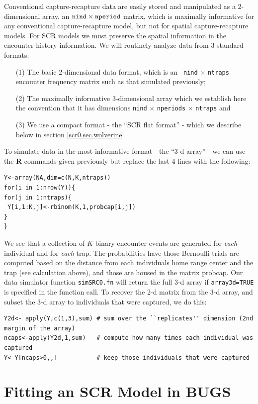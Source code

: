 Conventional capture-recapture data are easily stored and manipulated
as a 2-dimensional array, an $\mbox{\tt nind} \times \mbox{\tt
  nperiod}$ matrix, which is maximally informative for any
conventional capture-recapture model, but not for spatial
capture-recapture models.  For SCR models we must preserve the spatial
information in the encounter history information. We will routinely
analyze data from 3 standard formats:
\begin{itemize}
\item[(1)] The basic 2-dimensional data format, which is an \mbox{\tt
    nind} $\times$ \mbox{\tt ntraps} encounter frequency matrix such
  as that simulated previously;
\item[(2)] The maximally informative 3-dimensional array which we
  establish here the convention that it has dimensions \mbox{\tt nind}
  $\times$ \mbox{\tt nperiods} $\times$ \mbox{\tt ntraps} and
\item[(3)] We use a compact format - the ``SCR flat format'' - which
  we describe below in section \ref{scr0.sec.wolverine}.
\end{itemize}
To simulate data in the most informative format - the ``3-d array'' -
we can use the {\bf R} commands given previously but replace the last
4 lines with the following:
\begin{verbatim}
Y<-array(NA,dim=c(N,K,ntraps))
for(i in 1:nrow(Y)){
for(j in 1:ntraps){
 Y[i,1:K,j]<-rbinom(K,1,probcap[i,j])
}
}
\end{verbatim}
We see that a collection of $K$ binary encounter events are generated
for {\it each} individual and for {\it each} trap.  The probabilities
have those Bernoulli trials are computed based on the distance from
each individuals home range center and the trap (see calculation
above), and those are housed in the matrix probcap. Our data simulator
function \mbox{\tt simSRC0.fn} will return the full 3-d array if
\mbox{\tt array3d=TRUE} is specified in the function call.  To recover
the 2-d matrix from the 3-d array, and subset the 3-d array to
individuals that were captured, we do this:
{\small
\begin{verbatim}
Y2d<- apply(Y,c(1,3),sum) # sum over the ``replicates'' dimension (2nd margin of the array)
ncaps<-apply(Y2d,1,sum)   # compute how many times each individual was captured
Y<-Y[ncaps>0,,]           # keep those individuals that were captured
\end{verbatim}
}


\section{Fitting an SCR Model in BUGS}
\label{scr0.sec.winbugs1}

